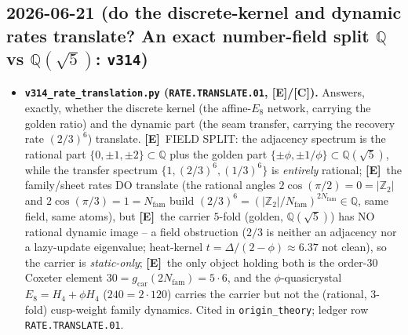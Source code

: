 \documentclass[11pt]{article}
\providecommand{\mE}{\textbf{[E]}}\providecommand{\mC}{\textbf{[C]}}
\providecommand{\gcar}{g_{\mathrm{car}}}\providecommand{\Nfam}{N_{\mathrm{fam}}}
\begin{document}
\subsection*{2026-06-21 (do the discrete-kernel and dynamic rates translate? An exact number-field split $\mathbb Q$ vs $\mathbb Q(\sqrt5)$: \texttt{v314})}
\begin{itemize}
\item \textbf{\texttt{v314\_rate\_translation.py} (\texttt{RATE.TRANSLATE.01}, \mE/\mC).} Answers, exactly, whether
  the discrete kernel (the affine-$E_8$ network, carrying the golden ratio) and the dynamic part (the seam transfer,
  carrying the recovery rate $(2/3)^6$) translate. \mE\ FIELD SPLIT: the adjacency spectrum is the rational part
  $\{0,\pm1,\pm2\}\subset\mathbb Q$ plus the golden part $\{\pm\phi,\pm1/\phi\}\subset\mathbb Q(\sqrt5)$, while the
  transfer spectrum $\{1,(2/3)^6,(1/3)^6\}$ is \emph{entirely} rational; \mE\ the family/sheet rates DO translate
  (the rational angles $2\cos(\pi/2){=}0=|\mathbb Z_2|$ and $2\cos(\pi/3){=}1=\Nfam$ build
  $(2/3)^6=(|\mathbb Z_2|/\Nfam)^{2\Nfam}\in\mathbb Q$, same field, same atoms), but \mE\ the carrier $5$-fold
  (golden, $\mathbb Q(\sqrt5)$) has NO rational dynamic image -- a field obstruction ($2/3$ is neither an adjacency
  nor a lazy-update eigenvalue; heat-kernel $t=\Delta/(2-\phi)\approx6.37$ not clean), so the carrier is
  \emph{static-only}; \mE\ the only object holding both is the order-$30$ Coxeter element
  $30=\gcar(2\Nfam)=5\cdot6$, and the $\phi$-quasicrystal $E_8=H_4{+}\phi H_4$ ($240=2\cdot120$) carries the carrier
  but not the (rational, $3$-fold) cusp-weight family dynamics. Cited in \texttt{origin\_theory}; ledger row
  \texttt{RATE.TRANSLATE.01}.
\end{itemize}
\end{document}
